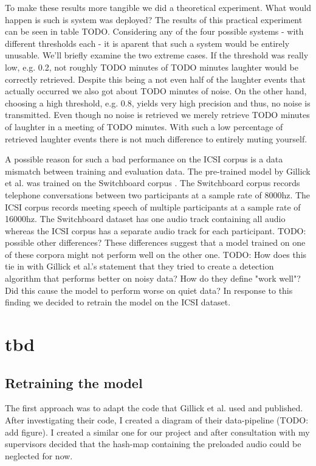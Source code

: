 \documentclass[bsc,frontabs,parskip,deptreport]{infthesis}
\begin{document}
To make these results more tangible we did a theoretical experiment. What would happen is such is system was deployed? The results of this practical experiment can be seen in table TODO. 
Considering any of the four possible systems - with different thresholds each - it is aparent that such a system would be entirely unusable. We'll briefly examine the two extreme cases. If the threshold was really low, e.g. 0.2, not roughly TODO minutes of TODO minutes laughter would be correctly retrieved. Despite this being a not even half of the laughter events that actually occurred we also got about TODO minutes of noise.  
On the other hand, choosing a high threshold, e.g. 0.8, yields very high precision and thus, no noise is transmitted. Even though no noise is retrieved we merely retrieve TODO minutes of laughter in a meeting of TODO minutes. With such a low percentage of retrieved laughter events there is not much difference to entirely muting yourself. 

A possible reason for such a bad performance on the ICSI corpus is a data mismatch between training and evaluation data. The pre-trained model by Gillick et al. \cite{gillick2021robust} was trained on the Switchboard corpus \cite{switchboard-corpus}. The Switchboard corpus records telephone conversations between two participants at a sample rate of 8000hz. The ICSI corpus records meeting speech of multiple participants at a sample rate of 16000hz. The Switchboard dataset has one audio track containing all audio whereas the ICSI corpus has a separate audio track for each participant.  
TODO: possible other differences?
These differences suggest that a model trained on one of these corpora might not perform well on the other one. 
TODO: How does this tie in with Gillick et al.'s statement that they tried to create a detection algorithm that performs better on noisy data? How do they define "work well"? Did this cause the model to perform worse on quiet data?
In response to this finding we decided to retrain the model on the ICSI dataset. 

\chapter{tbd}
\section{Retraining the model}
The first approach was to adapt the code that Gillick et al. used and published. After investigating their code, I created a diagram of their data-pipeline (TODO: add figure). 
I created a similar one for our project and after consultation with my supervisors decided that the hash-map containing the preloaded audio could be neglected for now. 
\end{document}
